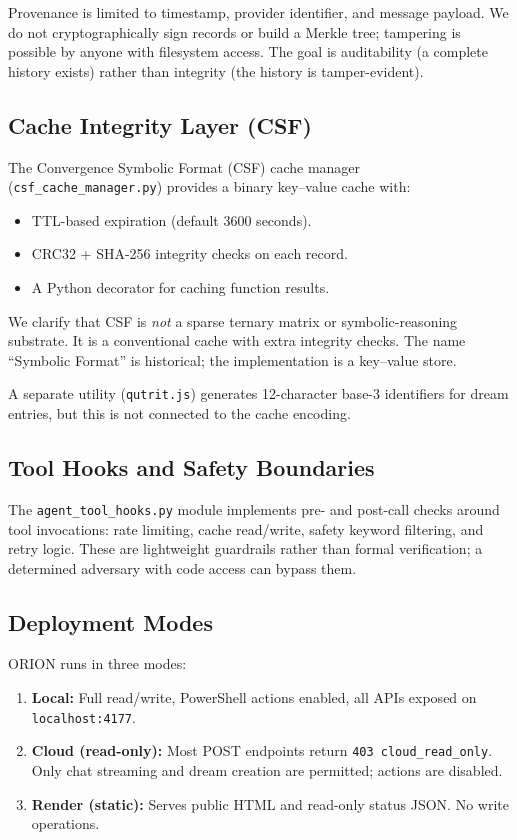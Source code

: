 \documentclass{article}
\begin{document}
Provenance is limited to timestamp, provider identifier, and message payload.
We do not cryptographically sign records or build a Merkle tree; tampering is
possible by anyone with filesystem access. The goal is auditability (a complete
history exists) rather than integrity (the history is tamper-evident).

\subsection{Cache Integrity Layer (CSF)}

The Convergence Symbolic Format (CSF) cache manager
(\texttt{csf\_cache\_manager.py}) provides a binary key--value cache with:
\begin{itemize}
    \item TTL-based expiration (default 3600 seconds).
    \item CRC32 + SHA-256 integrity checks on each record.
    \item A Python decorator for caching function results.
\end{itemize}

We clarify that CSF is \emph{not} a sparse ternary matrix or symbolic-reasoning
substrate. It is a conventional cache with extra integrity checks. The name
``Symbolic Format'' is historical; the implementation is a key--value store.

A separate utility (\texttt{qutrit.js}) generates 12-character base-3
identifiers for dream entries, but this is not connected to the cache encoding.

\subsection{Tool Hooks and Safety Boundaries}

The \texttt{agent\_tool\_hooks.py} module implements pre- and post-call checks
around tool invocations: rate limiting, cache read/write, safety keyword
filtering, and retry logic. These are lightweight guardrails rather than formal
verification; a determined adversary with code access can bypass them.

\subsection{Deployment Modes}

ORION runs in three modes:
\begin{enumerate}[label=(\arabic*)]
    \item \textbf{Local:} Full read/write, PowerShell actions enabled,
    all APIs exposed on \texttt{localhost:4177}.
    \item \textbf{Cloud (read-only):} Most POST endpoints return
    \texttt{403 cloud\_read\_only}. Only chat streaming and dream creation are
    permitted; actions are disabled.
    \item \textbf{Render (static):} Serves public HTML and read-only status
    JSON. No write operations.
\end{enumerate}
\end{document}

